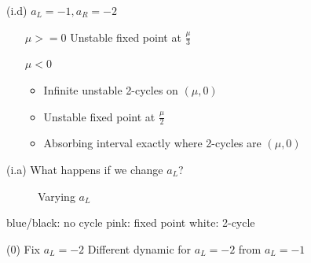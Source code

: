 \documentclass{beamer}
\newcounter{n}
\newcounter{f}
\begin{document}
\begin{frame}{(i.d) $a_L = -1, a_R = -2$}
    \begin{enumerate}
        \item[$\mu >= 0$] Unstable fixed point at $\frac{\mu}{3}$
        \item[$\mu < 0$] \begin{itemize}
            \item Infinite unstable 2-cycles on $(\mu, 0)$
            \item Unstable fixed point at $\frac{\mu}{2}$
            \item Absorbing interval exactly where 2-cycles are $(\mu, 0)$
        \end{itemize}
    \end{enumerate}
\end{frame}

\begin{frame}{(i.a) What happens if we change $a_L$?}
    \begin{figure}
        \centering
         \qquad
        \caption{Varying $a_L$}
    \end{figure}

    blue/black: no cycle
    \hspace*{\fill}
    pink: fixed point
    \hspace*{\fill}
    white: 2-cycle
\end{frame}

\begin{frame}{(0) Fix $a_L = -2$}
    Different dynamic for $a_L = -2$ from $a_L = -1$
\end{frame}
\end{document}
